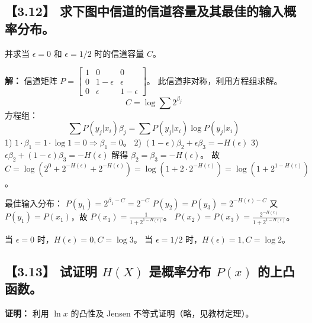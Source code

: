 \documentclass[11pt, a4paper]{article}
\begin{document}
\subsection*{【3.12】 求下图中信道的信道容量及其最佳的输入概率分布。}
并求当 $\epsilon=0$ 和 $\epsilon=1/2$ 时的信道容量 $C$。

\begin{center}
\end{center}

\textbf{解：}
信道矩阵 $P = \begin{bmatrix} 1 & 0 & 0 \\ 0 & 1-\epsilon & \epsilon \\ 0 & \epsilon & 1-\epsilon \end{bmatrix}$。
此信道非对称，利用方程组求解。
\[ C = \log \sum 2^{\beta_j} \]
方程组：
\[ \sum P(y_j|x_i)\beta_j = \sum P(y_j|x_i) \log P(y_j|x_i) \]
1) $1 \cdot \beta_1 = 1 \cdot \log 1 = 0 \Rightarrow \beta_1 = 0$。
2) $(1-\epsilon)\beta_2 + \epsilon\beta_3 = -H(\epsilon)$
3) $\epsilon\beta_2 + (1-\epsilon)\beta_3 = -H(\epsilon)$
解得 $\beta_2 = \beta_3 = -H(\epsilon)$。
故 $C = \log(2^0 + 2^{-H(\epsilon)} + 2^{-H(\epsilon)}) = \log(1 + 2 \cdot 2^{-H(\epsilon)}) = \log(1 + 2^{1-H(\epsilon)})$。

最佳输入分布：
$P(y_1) = 2^{\beta_1 - C} = 2^{-C}$
$P(y_2) = P(y_3) = 2^{-H(\epsilon) - C}$
又 $P(y_1) = P(x_1)$，故 $P(x_1) = \frac{1}{1 + 2^{1-H(\epsilon)}}$。
$P(x_2) = P(x_3) = \frac{2^{-H(\epsilon)}}{1 + 2^{1-H(\epsilon)}}$。

当 $\epsilon=0$ 时，$H(\epsilon)=0, C=\log 3$。
当 $\epsilon=1/2$ 时，$H(\epsilon)=1, C=\log 2$。

\subsection*{【3.13】 试证明 $H(X)$ 是概率分布 $P(x)$ 的上凸函数。}
\textbf{证明：}
利用 $\ln x$ 的凸性及 Jensen 不等式证明（略，见教材定理）。
\end{document}
